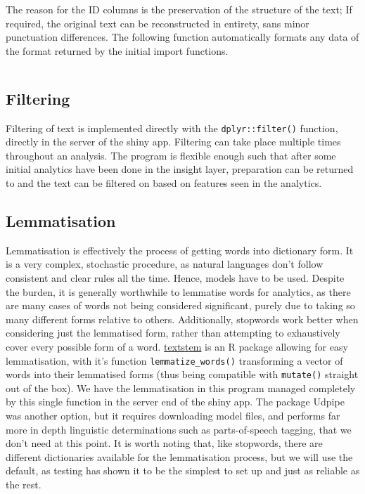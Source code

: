 \documentclass[11pt, a4paper, oneside]{report}
\begin{document}
The reason for the ID columns is the preservation of the structure of
the text; If required, the original text can be reconstructed in
entirety, sans minor punctuation differences. The following function
automatically formats any data of the format returned by the initial
import functions.

\inputminted[frame=lines,fontsize=\scriptsize,xleftmargin=\parindent,linenos]{R}{R/text-prep.R}

\subsection{Filtering}

Filtering of text is implemented directly with the
\texttt{dplyr::filter()} function, directly in the server of
the shiny app. Filtering can take place multiple times throughout an
analysis. The program is flexible enough such that after some initial
analytics have been done in the insight layer, preparation can be
returned to and the text can be filtered on based on features seen in
the analytics.

\subsection{Lemmatisation}

Lemmatisation is effectively the process of getting words into
dictionary form. It is a very complex, stochastic procedure, as
natural languages don't follow consistent and clear rules all the
time. Hence, models have to be used. Despite the burden, it is
generally worthwhile to lemmatise words for analytics, as there are
many cases of words not being considered significant, purely due to
taking so many different forms relative to others. Additionally,
stopwords work better when considering just the lemmatised form,
rather than attempting to exhaustively cover every possible form of a
word. \href{https://github.com/trinker/textstem/}{textstem} is an R
package allowing for easy lemmatisation, with it's function
\texttt{lemmatize_words()} transforming a vector of words into their
lemmatised forms (thus being compatible with \texttt{mutate()} straight
out of the box). We have the lemmatisation in this program managed
completely by this single function in the server end of the shiny app.
The package Udpipe was another option, but it requires downloading
model files, and performs far more in depth linguistic determinations
such as parts-of-speech tagging, that we don't need at this point.
It is worth noting that, like stopwords, there are different dictionaries
available for the lemmatisation process, but we will use the default,
as testing has shown it to be the simplest to set up and just as
reliable as the rest.
\end{document}
